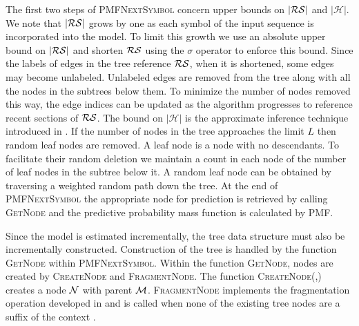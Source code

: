 The first two steps of \textsc{PMFNextSymbol} concern upper bounds on $|\RS|$ and $|\mathcal{H}|$.  We note that $|\RS|$ grows by one as each symbol of the input sequence is incorporated into the model.  To limit this growth we use an absolute upper bound on $|\RS|$ and shorten $\RS$ using the $\sigma$ operator to enforce this bound. Since the labels of edges in the tree reference $\RS$, when it is shortened, some edges may become unlabeled.  Unlabeled edges are removed from the tree along with all the nodes in the subtrees below them. To minimize the number of nodes removed this way, the edge indices can be updated as the algorithm progresses to reference recent sections of $\RS$.  The bound on $| \mathcal{H} |$ is the approximate inference technique introduced in \citep{Bartlett2010}.  If the number of nodes in the tree approaches the limit $L$ then random leaf nodes are removed.  A leaf node is a node with no descendants. To facilitate their random deletion we maintain a count in each node of the number of leaf nodes in the subtree below it.  A random leaf node can be obtained by traversing a weighted random path down the tree.  At the end of \textsc{PMFNextSymbol} the appropriate node for prediction is retrieved by calling \textsc{GetNode} and the predictive probability mass function is calculated by \textsc{PMF}.

Since the model is estimated incrementally, the tree data structure must also be incrementally constructed.  Construction of the tree is handled by the function \textsc{GetNode} within \textsc{PMFNextSymbol}.  Within the function \textsc{GetNode}, nodes are created by \textsc{CreateNode} and \textsc{FragmentNode}. The function \textsc{CreateNode(\N,\M)} creates a node $\N$ with parent $\M$. \textsc{FragmentNode} implements the fragmentation operation developed in \citep{Wood2009} and is called when none of the existing tree nodes are a suffix of the context \RS.  



